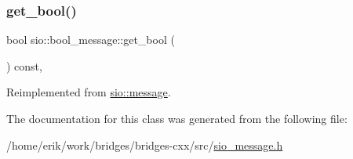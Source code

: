 \subsubsection{\texorpdfstring{get\+\_\+bool()}{get\_bool()}}
{\footnotesize\ttfamily bool sio\+::bool\+\_\+message\+::get\+\_\+bool (\begin{DoxyParamCaption}{ }\end{DoxyParamCaption}) const\hspace{0.3cm}{\ttfamily [inline]}, {\ttfamily [virtual]}}



Reimplemented from \hyperlink{classsio_1_1message_a3acbec589c3dc214d44dd4db1a6f8a2c}{sio\+::message}.



The documentation for this class was generated from the following file\+:\begin{DoxyCompactItemize}
\item 
/home/erik/work/bridges/bridges-\/cxx/src/\hyperlink{sio__message_8h}{sio\+\_\+message.\+h}\end{DoxyCompactItemize}
